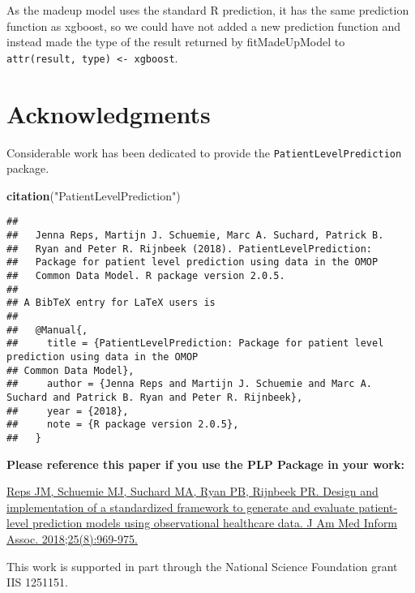 \documentclass[]{article}
\newenvironment{Shaded}{\begin{snugshade}}{\end{snugshade}}
\newcommand{\KeywordTok}[1]{\textcolor[rgb]{0.13,0.29,0.53}{\textbf{#1}}}
\newcommand{\StringTok}[1]{\textcolor[rgb]{0.31,0.60,0.02}{#1}}
\newcommand{\NormalTok}[1]{#1}
\begin{document}
As the madeup model uses the standard R prediction, it has the same
prediction function as xgboost, so we could have not added a new
prediction function and instead made the type of the result returned by
fitMadeUpModel to
\texttt{attr(result,\ \textquotesingle{}type\textquotesingle{})\ \textless{}-\ \textquotesingle{}xgboost\textquotesingle{}}.

\section{Acknowledgments}\label{acknowledgments}

Considerable work has been dedicated to provide the
\texttt{PatientLevelPrediction} package.

\begin{Shaded}
\begin{Highlighting}[]
\KeywordTok{citation}\NormalTok{(}\StringTok{"PatientLevelPrediction"}\NormalTok{)}
\end{Highlighting}
\end{Shaded}

\begin{verbatim}
## 
##   Jenna Reps, Martijn J. Schuemie, Marc A. Suchard, Patrick B.
##   Ryan and Peter R. Rijnbeek (2018). PatientLevelPrediction:
##   Package for patient level prediction using data in the OMOP
##   Common Data Model. R package version 2.0.5.
## 
## A BibTeX entry for LaTeX users is
## 
##   @Manual{,
##     title = {PatientLevelPrediction: Package for patient level prediction using data in the OMOP
## Common Data Model},
##     author = {Jenna Reps and Martijn J. Schuemie and Marc A. Suchard and Patrick B. Ryan and Peter R. Rijnbeek},
##     year = {2018},
##     note = {R package version 2.0.5},
##   }
\end{verbatim}

\textbf{Please reference this paper if you use the PLP Package in your
work:}

\href{http://dx.doi.org/10.1093/jamia/ocy032}{Reps JM, Schuemie MJ,
Suchard MA, Ryan PB, Rijnbeek PR. Design and implementation of a
standardized framework to generate and evaluate patient-level prediction
models using observational healthcare data. J Am Med Inform Assoc.
2018;25(8):969-975.}

This work is supported in part through the National Science Foundation
grant IIS 1251151.
\end{document}
